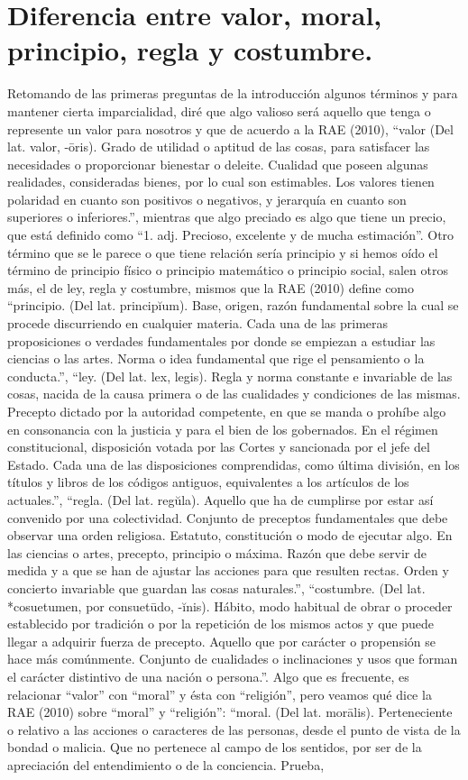 \section{Diferencia entre valor, moral, principio, regla y costumbre.}
Retomando de las primeras preguntas de la introducción algunos términos y para mantener cierta imparcialidad, diré que algo valioso será aquello que tenga o represente un valor para nosotros y que de acuerdo a la RAE (2010), “valor (Del lat. valor, -ōris). Grado de utilidad o aptitud de las cosas, para satisfacer las necesidades o proporcionar bienestar o deleite. Cualidad que poseen algunas realidades, consideradas bienes, por lo cual son estimables. Los valores tienen polaridad en cuanto son positivos o negativos, y jerarquía en cuanto son superiores o inferiores.”, mientras que algo preciado es algo que tiene un precio, que está definido como “1. adj. Precioso, excelente y de mucha estimación”. Otro término que se le parece o que tiene relación sería principio y si hemos oído el término de principio físico o principio matemático o principio social, salen otros más, el de ley, regla y costumbre, mismos que la RAE (2010) define como “principio. (Del lat. principĭum). Base, origen, razón fundamental sobre la cual se procede discurriendo en cualquier materia. Cada una de las primeras proposiciones o verdades fundamentales por donde se empiezan a estudiar las ciencias o las artes. Norma o idea fundamental que rige el pensamiento o la conducta.”, “ley. (Del lat. lex, legis). Regla y norma constante e invariable de las cosas, nacida de la causa primera o de las cualidades y condiciones de las mismas. Precepto dictado por la autoridad competente, en que se manda o prohíbe algo en consonancia con la justicia y para el bien de los gobernados. En el régimen constitucional, disposición votada por las Cortes y sancionada por el jefe del Estado. Cada una de las disposiciones comprendidas, como última división, en los títulos y libros de los códigos antiguos, equivalentes a los artículos de los actuales.”, “regla. (Del lat. regŭla). Aquello que ha de cumplirse por estar así convenido por una colectividad. Conjunto de preceptos fundamentales que debe observar una orden religiosa. Estatuto, constitución o modo de ejecutar algo. En las ciencias o artes, precepto, principio o máxima. Razón que debe servir de medida y a que se han de ajustar las acciones para que resulten rectas. Orden y concierto invariable que guardan las cosas naturales.”, “costumbre. (Del lat. *cosuetumen, por consuetūdo, -ĭnis). Hábito, modo habitual de obrar o proceder establecido por tradición o por la repetición de los mismos actos y que puede llegar a adquirir fuerza de precepto. Aquello que por carácter o propensión se hace más comúnmente. Conjunto de cualidades o inclinaciones y usos que forman el carácter distintivo de una nación o persona.”. Algo que es frecuente, es relacionar “valor” con “moral” y ésta con “religión”, pero veamos qué dice la RAE (2010) sobre “moral” y “religión”: “moral. (Del lat. morālis). Perteneciente o relativo a las acciones o caracteres de las personas, desde el punto de vista de la bondad o malicia. Que no pertenece al campo de los sentidos, por ser de la apreciación del entendimiento o de la conciencia. Prueba, 